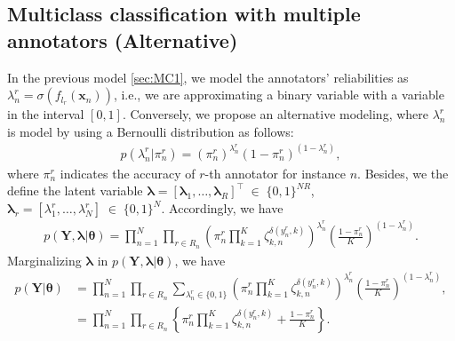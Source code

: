 \documentclass[9pt]{article}
\providecommand{\ve}[1]{{\bm{#1}}}%
\providecommand{\mat}[1]{{\bm{#1}}} %
\DeclareMathOperator{\en}{\!\,\in\!\,}
\providecommand{\ve}[1]{{\mathbf{#1}}}
\providecommand{\mat}[1]{{\mathbf{#1}}}
\begin{document}
\subsection{Multiclass classification with multiple annotators (Alternative)}\label{sec:MC2}
In the previous model \cref{sec:MC1}, we model the annotators' reliabilities as ${\lambda}_n^r=\sigma(f_{l_r}(\ve{x}_n))$, i.e., we are approximating a binary variable with a variable in the interval $[0,1]$. Conversely, we propose an alternative modeling, where ${\lambda}_n^r$ is model by using a Bernoulli distribution as follows:
\begin{align}
    p(\lambda_n^r|\pi_n^r) = {(\pi_n^r)}^{\lambda_n^r}(1-\pi_n^r)^{(1-\lambda_n^r)},
\end{align}
where $\pi_n^r$ indicates the accuracy of $r$-th annotator for instance $n$. Besides, we the define the latent variable $\bm{\lambda} = [\bm{\lambda}_1, \dots, \bm{\lambda}_R]^{\top}\en\{0,1\}^{NR}$, $\bm{\lambda}_r=[\lambda_1^r,\dots,\lambda_N^r]\en\{0,1\}^N$. Accordingly, we have 
\begin{align}
    p(\mat{Y},\bm{\lambda}|\bm{\theta}) = \prod^N_{n=1}\prod_{r\in R_n}\left(\pi_n^r\prod_{k=1}^{K}\zeta_{k,n}^{\delta(y_n^r,k)}\right)^{{\lambda}_n^r}\left(\frac{1-\pi_n^r}{K}\right)^{(1-{\lambda}_n^r)}.
\end{align}
Marginalizing $\bm{\lambda}$ in $p(\mat{Y},\bm{\lambda}|\bm{\theta})$, we have
    \begin{align}
        p(\mat{Y}|\bm{\theta}) &= \prod^N_{n=1}\prod_{r\in R_n}\sum_{\lambda_{n}^r\in \{0,1\}}\left(\pi_n^r\prod_{k=1}^{K}\zeta_{k,n}^{\delta(y_n^r,k)}\right)^{{\lambda}_n^r}\left(\frac{1-\pi_n^r}{K}\right)^{(1-{\lambda}_n^r)},\\
        &= \prod^N_{n=1}\prod_{r\in R_n}\left\{\pi_n^r\prod_{k=1}^{K}\zeta_{k,n}^{\delta(y_n^r,k)} + \frac{1-\pi_n^r}{K}  \right\}.
    \end{align}
\end{document}
